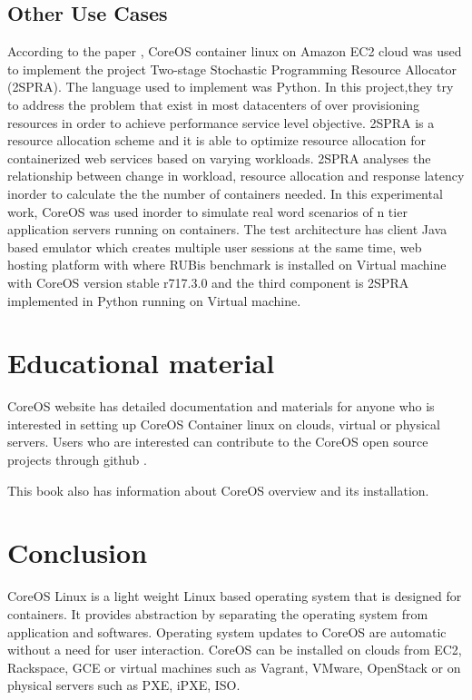 \documentclass[9pt,twocolumn,twoside]{styles/osajnl}
\begin{document}
\subsection{Other Use Cases}
According to the paper \cite{2SPRA}, CoreOS container linux on Amazon
EC2 cloud was used to implement the project Two-stage Stochastic
Programming Resource Allocator (2SPRA). The language used to implement
was Python. In this project,they try to address the problem that exist
in most datacenters of over provisioning resources in order to achieve
performance service level objective. 2SPRA is a resource allocation
scheme and it is able to optimize resource allocation for
containerized web services based on varying workloads. 2SPRA analyses
the relationship between change in workload, resource allocation and
response latency inorder to calculate the the number of containers
needed. In this experimental work, CoreOS was used inorder to simulate
real word scenarios of n tier application servers running on
containers. The test architecture has client Java based emulator which
creates multiple user sessions at the same time, web hosting platform
with where RUBis benchmark is installed on Virtual machine with CoreOS
version stable r717.3.0 and the third component is 2SPRA implemented
in Python running on Virtual machine.


\section{Educational material} 

CoreOS website \cite{www-coreOSquickstart} has detailed documentation
and materials for anyone who is interested in setting up CoreOS
Container linux on clouds, virtual or physical servers.  Users who are
interested can contribute to the CoreOS open source projects through
github \cite {www-coregit}.

This book \cite{coreOSBook} also has information about CoreOS overview
and its installation.

\section{Conclusion} 
CoreOS Linux is a light weight Linux based operating system that is
designed for containers. It provides abstraction by separating the
operating system from application and softwares. Operating system
updates to CoreOS are automatic without a need for user
interaction. CoreOS can be installed on clouds from EC2, Rackspace,
GCE or virtual machines such as Vagrant, VMware, OpenStack or on
physical servers such as PXE, iPXE, ISO.  
\end{document}
